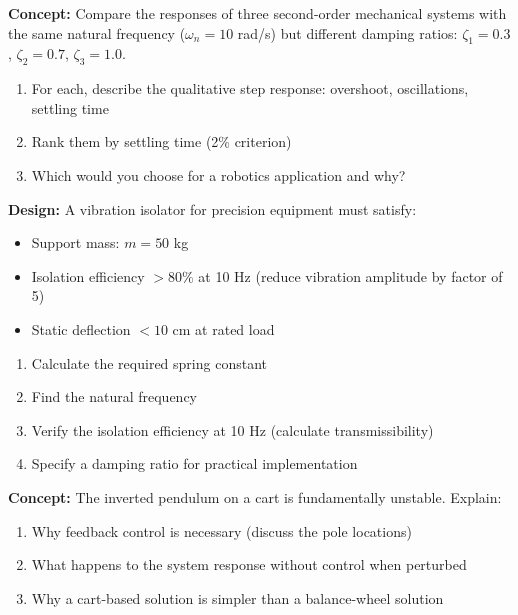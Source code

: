 \begin{exercise}
\textbf{Concept:} Compare the responses of three second-order mechanical systems with the same natural frequency ($\omega_n = 10$ rad/s) but different damping ratios: $\zeta_1 = 0.3$, $\zeta_2 = 0.7$, $\zeta_3 = 1.0$.

\begin{enumerate}[label=(\alph*)]
    \item For each, describe the qualitative step response: overshoot, oscillations, settling time
    \item Rank them by settling time (2\% criterion)
    \item Which would you choose for a robotics application and why?
\end{enumerate}
\end{exercise}

\begin{exercise}
\textbf{Design:} A vibration isolator for precision equipment must satisfy:
\begin{itemize}
    \item Support mass: $m = 50$ kg
    \item Isolation efficiency $> 80\%$ at 10 Hz (reduce vibration amplitude by factor of 5)
    \item Static deflection $< 10$ cm at rated load
\end{itemize}

\begin{enumerate}[label=(\alph*)]
    \item Calculate the required spring constant
    \item Find the natural frequency
    \item Verify the isolation efficiency at 10 Hz (calculate transmissibility)
    \item Specify a damping ratio for practical implementation
\end{enumerate}
\end{exercise}

\begin{exercise}
\textbf{Concept:} The inverted pendulum on a cart is fundamentally unstable. Explain:

\begin{enumerate}[label=(\alph*)]
    \item Why feedback control is necessary (discuss the pole locations)
    \item What happens to the system response without control when perturbed
    \item Why a cart-based solution is simpler than a balance-wheel solution
\end{enumerate}
\end{exercise}

